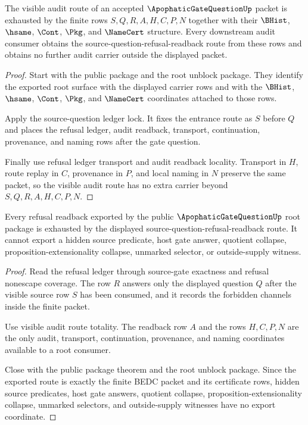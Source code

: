 \begin{theorem}
\label{thm:apophatic-gate-question-visible-audit-route-totality}
The visible audit route of an accepted $\ApophaticGateQuestionUp$ packet is exhausted by the finite rows $S,Q,R,A,H,C,P,N$ together with their $\BHist$, $\hsame$, $\Cont$, $\Pkg$, and $\NameCert$ structure. Every downstream audit consumer obtains the source-question-refusal-readback route from these rows and obtains no further audit carrier outside the displayed packet.
\end{theorem}
\begin{proof}
Start with the public \NameCert{} package and the root unblock package. They identify the exported root surface with the displayed carrier rows and with the $\BHist$, $\hsame$, $\Cont$, $\Pkg$, and $\NameCert$ coordinates attached to those rows.

Apply the source-question ledger lock. It fixes the entrance route as $S$ before $Q$ and places the refusal ledger, audit readback, transport, continuation, provenance, and naming rows after the gate question.

Finally use refusal ledger transport and audit readback locality. Transport in $H$, route replay in $C$, provenance in $P$, and local naming in $N$ preserve the same packet, so the visible audit route has no extra carrier beyond $S,Q,R,A,H,C,P,N$.
\end{proof}

\begin{theorem}
\label{thm:apophatic-gate-question-refusal-readback-exhaustion}
Every refusal readback exported by the public $\ApophaticGateQuestionUp$ root package is exhausted by the displayed source-question-refusal-readback route. It cannot export a hidden source predicate, host gate answer, quotient collapse, proposition-extensionality collapse, unmarked selector, or outside-supply witness.
\end{theorem}
\begin{proof}
Read the refusal ledger through source-gate exactness and refusal nonescape coverage. The row $R$ answers only the displayed question $Q$ after the visible source row $S$ has been consumed, and it records the forbidden channels inside the finite packet.

Use visible audit route totality. The readback row $A$ and the rows $H,C,P,N$ are the only audit, transport, continuation, provenance, and naming coordinates available to a root consumer.

Close with the public package theorem and the root unblock package. Since the exported route is exactly the finite BEDC packet and its certificate rows, hidden source predicates, host gate answers, quotient collapse, proposition-extensionality collapse, unmarked selectors, and outside-supply witnesses have no export coordinate.
\end{proof}

